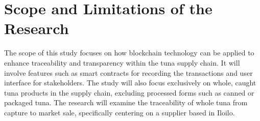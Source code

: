 \begin{comment}
How to formulate your research objectives:
1. Identify what research steps do you need to perform to achieve your general objective.
2. Identify the questions that must be answered for you to achieve your general objective.
    Thereafter, convert these questions into action statements

Example #1:

Research Question:
  What are the general features of a web-based learning environment?

Specific Objective:
   To review existing web-based learning environment that teaches language learning for children


Example #2:

Research Question:
   How will you represent commonsense knowledge for use by computer systems?

Specific Objective:
   To identify knowledge representation approaches used by existing story generation systems

Example #3:
Research Question:
   What types of storytelling knowledge are needed to generate stories?

Specific Objective:
    To identify the different types of storytelling knowledge used in generating stories

Example #4:
Research Question:
    What machine learning approaches will you utilize?

Specific Objective:
    To determine existing machine learning algorithms [that can be used in training the computer system to detect cyberbullying cases] 

Example #5: Research Question:
    How will your research output be evaluated?

Specific Objective:
    To define evaluation metrics for validating the accuracy of the translation

\end{comment}

%
%


\section{Scope and Limitations of the Research}
\label{sec:scopelimitations}

The scope of this study focuses on how blockchain technology can be applied to enhance traceability and transparency within the tuna supply chain. It will involve features such as smart contracts for recording the transactions and user interface for stakeholders. The study will also focus exclusively on whole, caught tuna products in the supply chain, excluding processed forms such as canned or packaged tuna. The research will examine the traceability of whole tuna from capture to market sale, specifically centering on a supplier based in Iloilo. 

